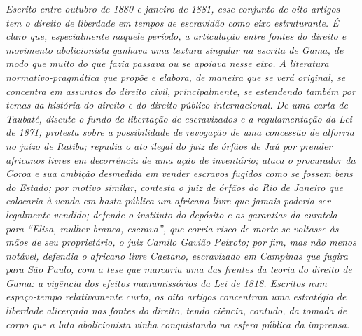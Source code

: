{\begin{didas}
\emph{Escrito entre outubro de 1880 e janeiro de 1881, esse conjunto de
oito artigos tem o direito de liberdade em tempos de escravidão como
eixo estruturante. É claro que, especialmente naquele período, a
articulação entre fontes do direito e movimento abolicionista ganhava
uma textura singular na escrita de Gama, de modo que muito do que fazia
passava ou se apoiava nesse eixo. A literatura normativo-pragmática que
propõe e elabora, de maneira que se verá original, se concentra em
assuntos do direito civil, principalmente, se estendendo também por
temas da história do direito e do direito público internacional. De uma
carta de Taubaté, discute o fundo de libertação de escravizados e a
regulamentação da Lei de 1871; protesta sobre a possibilidade de
revogação de uma concessão de alforria no juízo de Itatiba; repudia o
ato ilegal do juiz de órfãos de Jaú por prender africanos livres em
decorrência de uma ação de inventário; ataca o procurador da Coroa e sua
ambição desmedida em vender escravos fugidos como se fossem bens do
Estado; por motivo similar, contesta o juiz de órfãos do Rio de Janeiro
que colocaria à venda em hasta pública um africano livre que jamais
poderia ser legalmente vendido; defende o instituto do depósito e as
garantias da curatela para ``Elisa, mulher branca, escrava'', que corria
risco de morte se voltasse às mãos de seu proprietário, o juiz Camilo
Gavião Peixoto; por fim, mas não menos notável, defendia o africano
livre Caetano, escravizado em Campinas que fugira para São Paulo, com a
tese que marcaria uma das frentes da teoria do direito de Gama: a
vigência dos efeitos manumissórios da Lei de 1818. Escritos num
espaço-tempo relativamente curto, os oito artigos concentram uma
estratégia de liberdade alicerçada nas fontes do direito, tendo ciência,
contudo, da tomada de corpo que a luta abolicionista vinha conquistando
na esfera pública da imprensa.}
\end{didas}


}
